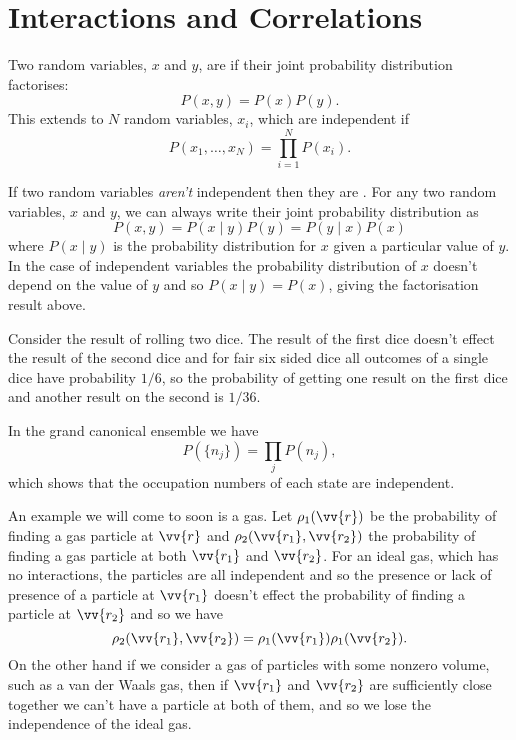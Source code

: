 \documentclass[fleqn]{NotesClass}
\begin{document}
    \section{Interactions and Correlations}
    Two random variables, \(x\) and \(y\), are  if their joint probability distribution factorises:
    \begin{equation}
        P(x, y) = P(x)P(y).
    \end{equation}
    This extends to \(N\) random variables, \(x_i\), which are independent if
    \begin{equation}
        P(x_1, \dotsc, x_N) = \prod_{i = 1}^{N} P(x_i).
    \end{equation}
    
    If two random variables \emph{aren't} independent then they are .
    For any two random variables, \(x\) and \(y\), we can always write their joint probability distribution as
    \begin{equation}
        P(x, y) = P(x \mid y)P(y) = P(y \mid x) P(x)
    \end{equation}
    where \(P(x \mid y)\) is the probability distribution for \(x\) given a particular value of \(y\).
    In the case of independent variables the probability distribution of \(x\) doesn't depend on the value of \(y\) and so \(P(x \mid y) = P(x)\), giving the factorisation result above.
    
    \begin{exm}{}
        Consider the result of rolling two dice.
        The result of the first dice doesn't effect the result of the second dice and for fair six sided dice all outcomes of a single dice have probability \(1/6\), so the probability of getting one result on the first dice and another result on the second is \(1/36\).
        
        In the grand canonical ensemble we have
        \begin{equation}
            P(\{n_j\}) = \prod_j P(n_j),
        \end{equation}
        which shows that the occupation numbers of each state are independent.
        
        An example we will come to soon is a gas.
        Let \(\rho_1(\vv{r})\) be the probability of finding a gas particle at \(\vv{r}\) and \(\rho_2(\vv{r_1}, \vv{r_2})\) the probability of finding a gas particle at both \(\vv{r_1}\) and \(\vv{r_2}\).
        For an ideal gas, which has no interactions, the particles are all independent and so the presence or lack of presence of a particle at \(\vv{r_1}\) doesn't effect the probability of finding a particle at \(\vv{r_2}\) and so we have
        \begin{equation}
            \rho_2(\vv{r_1}, \vv{r_2}) = \rho_1(\vv{r_1}) \rho_1(\vv{r_2}).
        \end{equation}
        On the other hand if we consider a gas of particles with some nonzero volume, such as a van der Waals gas, then if \(\vv{r_1}\) and \(\vv{r_2}\) are sufficiently close together we can't have a particle at both of them, and so we lose the independence of the ideal gas.
    \end{exm}
    
\end{document}
